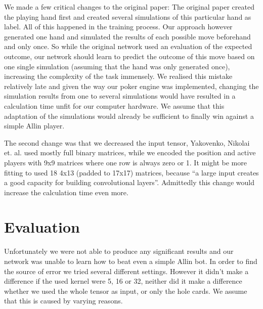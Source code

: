 \documentclass[]{report}
\begin{document}
We made a few critical changes to the original paper:
The original paper created the playing hand first and created several
simulations of this particular hand as label. All of this happened
in the training process. Our approach however generated one hand and
simulated the results of each possible move beforehand and only once.
So while the original network used an evaluation of the expected outcome,
our network should learn to predict the outcome of this move based
on one single simulation (assuming that the hand was only generated
once), increasing the complexity of the task immensely. We realised
this mistake relatively late and given the way our poker engine was implemented,
changing the simulation results from one to several simulations would
have resulted in a calculation time unfit for our computer hardware. We assume
that this adaptation of the simulations would already be sufficient
to finally win against a simple Allin player.

The second change was that we decreased the input tensor, Yakovenko,
Nikolai et. al. used mostly full binary matrices, while we encoded
the position and active players with 9x9 matrices where one row is
always zero or 1. It might be more fitting to used 18 4x13 (padded
to 17x17) matrices, because ``a large input creates a good capacity
for building convolutional layers''\cite{1}. Admittedly this change
would increase the calculation time even more.

\section{Evaluation \label{see:evaluation} }

Unfortunately we were not able to produce any significant results and our network was unable to learn how to beat even a simple Allin bot. In order to find the source of error we tried several different settings. However it didn't make a difference if the used kernel were 5, 16 or 32, neither did it make a difference whether we used the whole tensor as input, or only the hole cards. We assume that this is caused by varying reasons. 
\end{document}
